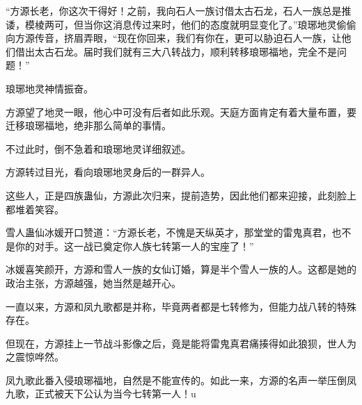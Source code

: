 \begin{this_body}
“方源长老，你这次干得好！之前，我向石人一族讨借太古石龙，石人一族总是推诿，模棱两可，但当你这消息传过来时，他们的态度就明显变化了。”琅琊地灵偷偷向方源传音，挤眉弄眼，“现在你回来，我们有你在，更可以胁迫石人一族，让他们借出太古石龙。届时我们就有三大八转战力，顺利转移琅琊福地，完全不是问题！”

琅琊地灵神情振奋。

方源望了地灵一眼，他心中可没有后者如此乐观。天庭方面肯定有着大量布置，要迁移琅琊福地，绝非那么简单的事情。

不过此时，倒不急着和琅琊地灵详细叙述。

方源转过目光，看向琅琊地灵身后的一群异人。

这些人，正是四族蛊仙，方源此次归来，提前造势，因此他们都来迎接，此刻脸上都堆着笑容。

雪人蛊仙冰媛开口赞道：“方源长老，不愧是天纵英才，那堂堂的雷鬼真君，也不是你的对手。这一战已奠定你人族七转第一人的宝座了！”

冰媛喜笑颜开，方源和雪人一族的女仙订婚，算是半个雪人一族的人。这都是她的政治主张，方源越强，她当然是越开心。

一直以来，方源和凤九歌都是并称，毕竟两者都是七转修为，但能力战八转的特殊存在。

但现在，方源挂上一节战斗影像之后，竟是能将雷鬼真君痛揍得如此狼狈，世人为之震惊哗然。

凤九歌此番入侵琅琊福地，自然是不能宣传的。如此一来，方源的名声一举压倒凤九歌，正式被天下公认为当今七转第一人！u

\end{this_body}

